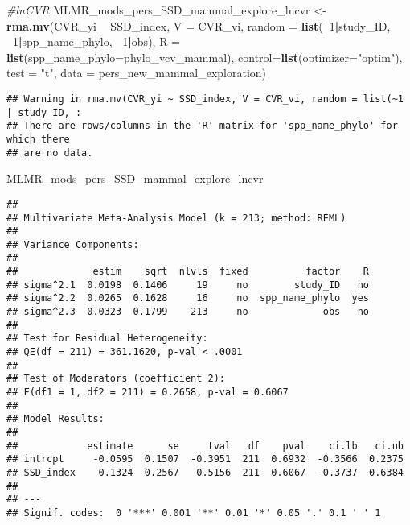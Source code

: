 \documentclass[]{article}
\newenvironment{Shaded}{\begin{snugshade}}{\end{snugshade}}
\newcommand{\KeywordTok}[1]{\textcolor[rgb]{0.13,0.29,0.53}{\textbf{#1}}}
\newcommand{\DataTypeTok}[1]{\textcolor[rgb]{0.13,0.29,0.53}{#1}}
\newcommand{\DecValTok}[1]{\textcolor[rgb]{0.00,0.00,0.81}{#1}}
\newcommand{\StringTok}[1]{\textcolor[rgb]{0.31,0.60,0.02}{#1}}
\newcommand{\CommentTok}[1]{\textcolor[rgb]{0.56,0.35,0.01}{\textit{#1}}}
\newcommand{\OperatorTok}[1]{\textcolor[rgb]{0.81,0.36,0.00}{\textbf{#1}}}
\newcommand{\NormalTok}[1]{#1}
\begin{document}
\begin{Shaded}
\begin{Highlighting}[]
    \CommentTok{#lnCVR}
\NormalTok{    MLMR_mods_pers_SSD_mammal_explore_lncvr <-}\StringTok{ }\KeywordTok{rma.mv}\NormalTok{(CVR_yi }\OperatorTok{~}\StringTok{ }\NormalTok{SSD_index, }\DataTypeTok{V =}\NormalTok{ CVR_vi, }
                                            \DataTypeTok{random =} \KeywordTok{list}\NormalTok{(}\OperatorTok{~}\DecValTok{1}\OperatorTok{|}\NormalTok{study_ID, }\OperatorTok{~}\DecValTok{1}\OperatorTok{|}\NormalTok{spp_name_phylo, }\OperatorTok{~}\DecValTok{1}\OperatorTok{|}\NormalTok{obs), }
                                            \DataTypeTok{R =} \KeywordTok{list}\NormalTok{(}\DataTypeTok{spp_name_phylo=}\NormalTok{phylo_vcv_mammal), }\DataTypeTok{control=}\KeywordTok{list}\NormalTok{(}\DataTypeTok{optimizer=}\StringTok{"optim"}\NormalTok{), }
                                            \DataTypeTok{test =} \StringTok{"t"}\NormalTok{, }\DataTypeTok{data =}\NormalTok{ pers_new_mammal_exploration)}
\end{Highlighting}
\end{Shaded}

\begin{verbatim}
## Warning in rma.mv(CVR_yi ~ SSD_index, V = CVR_vi, random = list(~1 | study_ID, :
## There are rows/columns in the 'R' matrix for 'spp_name_phylo' for which there
## are no data.
\end{verbatim}

\begin{Shaded}
\begin{Highlighting}[]
\NormalTok{    MLMR_mods_pers_SSD_mammal_explore_lncvr}
\end{Highlighting}
\end{Shaded}

\begin{verbatim}
## 
## Multivariate Meta-Analysis Model (k = 213; method: REML)
## 
## Variance Components:
## 
##             estim    sqrt  nlvls  fixed          factor    R 
## sigma^2.1  0.0198  0.1406     19     no        study_ID   no 
## sigma^2.2  0.0265  0.1628     16     no  spp_name_phylo  yes 
## sigma^2.3  0.0323  0.1799    213     no             obs   no 
## 
## Test for Residual Heterogeneity:
## QE(df = 211) = 361.1620, p-val < .0001
## 
## Test of Moderators (coefficient 2):
## F(df1 = 1, df2 = 211) = 0.2658, p-val = 0.6067
## 
## Model Results:
## 
##            estimate      se     tval   df    pval    ci.lb   ci.ub 
## intrcpt     -0.0595  0.1507  -0.3951  211  0.6932  -0.3566  0.2375    
## SSD_index    0.1324  0.2567   0.5156  211  0.6067  -0.3737  0.6384    
## 
## ---
## Signif. codes:  0 '***' 0.001 '**' 0.01 '*' 0.05 '.' 0.1 ' ' 1
\end{verbatim}
\end{document}
